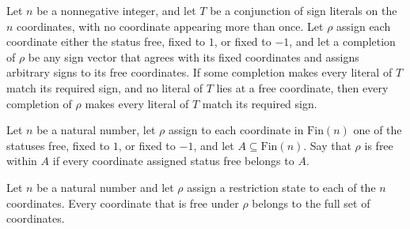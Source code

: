 \begin{theorem}
\label{FABL.DNFTerm.eval_complete_eq_neg_one_of_compatible_of_no_free}
\leanok
{}
Let $n$ be a nonnegative integer, and let $T$ be a conjunction of sign literals on the
$n$ coordinates, with no coordinate appearing more than once. Let $\rho$ assign each
coordinate either the status free, fixed to $1$, or fixed to $-1$, and let a completion
of $\rho$ be any sign vector that agrees with its fixed coordinates and assigns
arbitrary signs to its free coordinates. If some completion makes every literal of $T$
match its required sign, and no literal of $T$ lies at a free coordinate, then every
completion of $\rho$ makes every literal of $T$ match its required sign.
\end{theorem}

\begin{definition}
\label{FABL.CoordRestriction.FreeWithin}
\leanok
{}
Let $n$ be a natural number, let $\rho$ assign to each coordinate in $\mathrm{Fin}(n)$
one of the statuses free, fixed to $1$, or fixed to $-1$, and let
$A\subseteq\mathrm{Fin}(n)$. Say that $\rho$ is free within $A$ if every coordinate
assigned status free belongs to $A$.
\end{definition}

\begin{theorem}
\label{FABL.CoordRestriction.freeWithin_univ}
\leanok
{}
Let $n$ be a natural number and let $\rho$ assign a restriction state to each of the $n$
coordinates. Every coordinate that is free under $\rho$ belongs to the full set of
coordinates.
\end{theorem}

